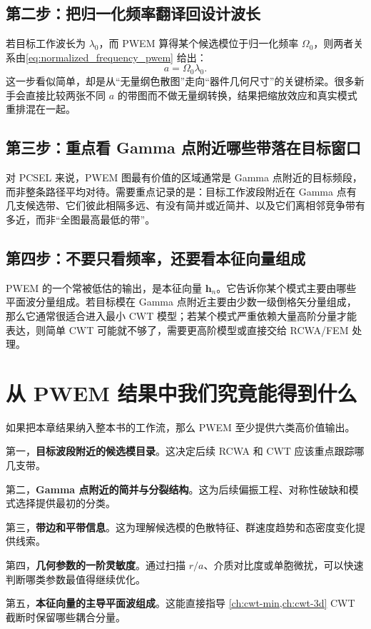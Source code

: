 \subsection*{第二步：把归一化频率翻译回设计波长}
若目标工作波长为 $\lambda_0$，而 PWEM 算得某个候选模位于归一化频率 $\Omega_0$，则两者关系由\cref{eq:normalized_frequency_pwem} 给出：
\begin{equation}
 a = \Omega_0\lambda_0.
\end{equation}
这一步看似简单，却是从“无量纲色散图”走向“器件几何尺寸”的关键桥梁。很多新手会直接比较两张不同 $a$ 的带图而不做无量纲转换，结果把缩放效应和真实模式重排混在一起。

\subsection*{第三步：重点看 Gamma 点附近哪些带落在目标窗口}
对 PCSEL 来说，PWEM 图最有价值的区域通常是 Gamma 点附近的目标频段，而非整条路径平均对待。需要重点记录的是：目标工作波段附近在 Gamma 点有几支候选带、它们彼此相隔多远、有没有简并或近简并、以及它们离相邻竞争带有多近，而非“全图最高最低的带”。

\subsection*{第四步：不要只看频率，还要看本征向量组成}
PWEM 的一个常被低估的输出，是本征向量 $\bm h_n$。它告诉你某个模式主要由哪些平面波分量组成。若目标模在 Gamma 点附近主要由少数一级倒格矢分量组成，那么它通常很适合进入最小 CWT 模型；若某个模式严重依赖大量高阶分量才能表达，则简单 CWT 可能就不够了，需要更高阶模型或直接交给 RCWA/FEM 处理。

\section{从 PWEM 结果中我们究竟能得到什么}
如果把本章结果纳入整本书的工作流，那么 PWEM 至少提供六类高价值输出。

第一，\textbf{目标波段附近的候选模目录}。这决定后续 RCWA 和 CWT 应该重点跟踪哪几支带。

第二，\textbf{Gamma 点附近的简并与分裂结构}。这为后续偏振工程、对称性破缺和模式选择提供最初的分类。

第三，\textbf{带边和平带信息}。这为理解候选模的色散特征、群速度趋势和态密度变化提供线索。

第四，\textbf{几何参数的一阶灵敏度}。通过扫描 $r/a$、介质对比度或单胞微扰，可以快速判断哪类参数最值得继续优化。

第五，\textbf{本征向量的主导平面波组成}。这能直接指导 \cref{ch:cwt-min,ch:cwt-3d} CWT 截断时保留哪些耦合分量。

